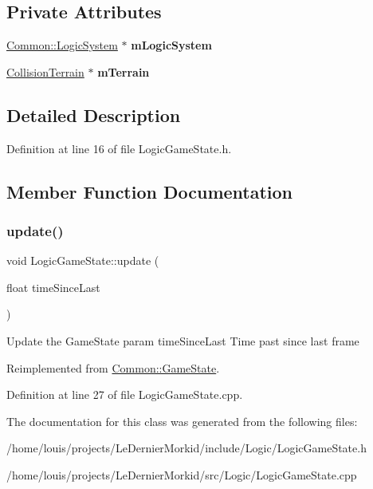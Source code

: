 \subsection*{Private Attributes}
\begin{DoxyCompactItemize}
\item 
\mbox{\label{class_logic_game_state_a58c6a54b8bd2267a6aa849e09d9327de}} 
\hyperlink{class_common_1_1_logic_system}{Common\+::\+Logic\+System} $\ast$ {\bfseries m\+Logic\+System}
\item 
\mbox{\label{class_logic_game_state_a64509df6336615d8f8fc7eb789614108}} 
\hyperlink{class_collision_terrain}{Collision\+Terrain} $\ast$ {\bfseries m\+Terrain}
\end{DoxyCompactItemize}


\subsection{Detailed Description}


Definition at line 16 of file Logic\+Game\+State.\+h.



\subsection{Member Function Documentation}
\mbox{\label{class_logic_game_state_a144a2deb659d903956bd955d86c4d6b7}} 
\subsubsection{\texorpdfstring{update()}{update()}}
{\footnotesize\ttfamily void Logic\+Game\+State\+::update (\begin{DoxyParamCaption}\item[{float}]{time\+Since\+Last }\end{DoxyParamCaption})\hspace{0.3cm}{\ttfamily [virtual]}}

Update the Game\+State param time\+Since\+Last Time past since last frame 

Reimplemented from \hyperlink{class_common_1_1_game_state_a38271924996d8c1bbdcbfee6ffe63f95}{Common\+::\+Game\+State}.



Definition at line 27 of file Logic\+Game\+State.\+cpp.



The documentation for this class was generated from the following files\+:\begin{DoxyCompactItemize}
\item 
/home/louis/projects/\+Le\+Dernier\+Morkid/include/\+Logic/Logic\+Game\+State.\+h\item 
/home/louis/projects/\+Le\+Dernier\+Morkid/src/\+Logic/Logic\+Game\+State.\+cpp\end{DoxyCompactItemize}
